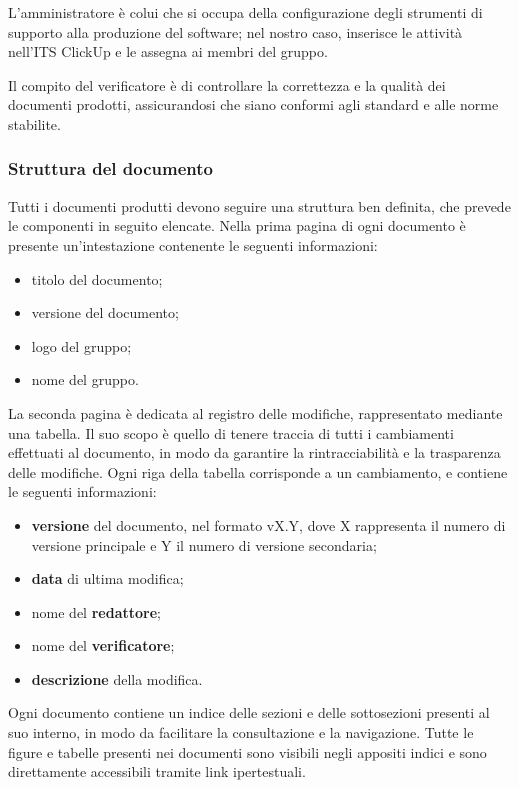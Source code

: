 L’amministratore è colui che si occupa della configurazione degli strumenti di supporto alla produzione del software; nel nostro caso,
inserisce le attività nell'ITS ClickUp e le assegna ai membri del gruppo.

Il compito del verificatore è di controllare la correttezza e la qualità dei documenti prodotti, assicurandosi che siano conformi agli standard e alle norme stabilite.

\subsubsection{Struttura del documento}
Tutti i documenti produtti devono seguire una struttura ben definita, che prevede le componenti in seguito elencate.
Nella prima pagina di ogni documento è presente un'intestazione contenente le seguenti informazioni:
\begin{itemize}
	\item titolo del documento;
	\item versione del documento;
	\item logo del gruppo;
	\item nome del gruppo.
\end{itemize}

La seconda pagina è dedicata al registro delle modifiche, rappresentato mediante una tabella. Il suo scopo è quello di tenere traccia di tutti i cambiamenti effettuati al documento,
in modo da garantire la rintracciabilità e la trasparenza delle modifiche. Ogni riga della tabella corrisponde a un cambiamento, e contiene le seguenti informazioni:
\begin{itemize}
	\item \textbf{versione} del documento, nel formato vX.Y, dove X rappresenta il numero di versione principale e Y il numero di versione secondaria;
	\item \textbf{data} di ultima modifica;
	\item nome del \textbf{redattore};
	\item nome del \textbf{verificatore};
	\item \textbf{descrizione} della modifica.
\end{itemize}

Ogni documento contiene un indice delle sezioni e delle sottosezioni presenti al suo interno, in modo da facilitare la consultazione e la navigazione.
Tutte le figure e tabelle presenti nei documenti sono visibili negli appositi indici e sono direttamente accessibili tramite link ipertestuali.

